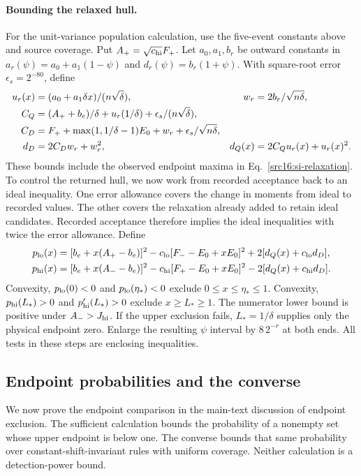 \paragraph{Bounding the relaxed hull.}
For the unit-variance population calculation, use the five-event constants above and source coverage. Put $A_+=\sqrt{c_{\rm hi}}F_+$. Let $a_0,a_1,b_r$ be outward constants in $a_r(\psi)=a_0+a_1(1-\psi)$ and $d_r(\psi)=b_r(1+\psi)$. With square-root error $\epsilon_s=2^{-80}$, define
\begin{align}\label{src16:si-rounded-hull}
 u_r(x)&=(a_0+a_1\delta x)/(n\sqrt\delta),& w_r&=2b_r/\sqrt{n\delta},\notag\\
 C_Q&=(A_++b_e)/\delta+u_r(1/\delta)+\epsilon_s/(n\sqrt\delta),\notag\\
 C_D&=F_++\max(1,1/\delta-1)E_0+w_r+\epsilon_s/\sqrt{n\delta},\notag\\
 d_D&=2C_Dw_r+w_r^2,&d_Q(x)&=2C_Qu_r(x)+u_r(x)^2.
\end{align}
These bounds include the observed endpoint maxima in Eq.~\eqref{src16:si-relaxation}. To control the returned hull, we now work from recorded acceptance back to an ideal inequality. One error allowance covers the change in moments from ideal to recorded values. The other covers the relaxation already added to retain ideal candidates. Recorded acceptance therefore implies the ideal inequalities with twice the error allowance. Define
\begin{align}\label{src16:si-exclusion-polys}
 p_{\rm lo}(x)&=[b_e+x(A_+-b_e)]^2
 -c_{\rm lo}[F_--E_0+xE_0]^2+2[d_Q(x)+c_{\rm lo}d_D],\notag\\
 p_{\rm hi}(x)&=[b_e+x(A_--b_e)]^2
 -c_{\rm hi}[F_+-E_0+xE_0]^2-2[d_Q(x)+c_{\rm hi}d_D].
\end{align}
Convexity, $p_{\rm lo}(0)<0$ and $p_{\rm lo}(\eta_*)<0$ exclude $0\le x\le\eta_*\le1$. Convexity, $p_{\rm hi}(L_*)>0$ and $p'_{\rm hi}(L_*)>0$ exclude $x\ge L_*\ge1$. The numerator lower bound is positive under $A_->J_{\rm hi}$. If the upper exclusion fails, $L_*=1/\delta$ supplies only the physical endpoint zero. Enlarge the resulting $\psi$ interval by $8\,2^{-r}$ at both ends. All tests in these steps are enclosing inequalities.

\subsection{Endpoint probabilities and the converse}\label{src16:si-converse}
We now prove the endpoint comparison in the main-text discussion of endpoint exclusion. The sufficient calculation bounds the probability of a nonempty set whose upper endpoint is below one. The converse bounds that same probability over constant-shift-invariant rules with uniform coverage. Neither calculation is a detection-power bound.

